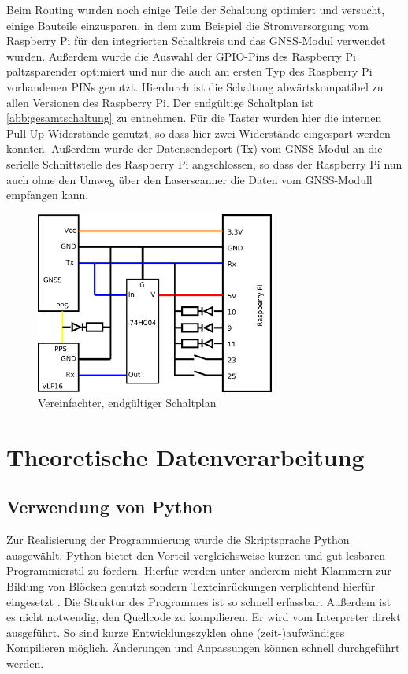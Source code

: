 \documentclass[a4paper,12pt,bibliography=totoc, listof=totoc,titlepage,pointlessnumbers]{scrreprt}
\begin{document}
Beim Routing wurden noch einige Teile der Schaltung optimiert und versucht, einige Bauteile einzusparen, in dem zum Beispiel die Stromversorgung vom Raspberry Pi für den integrierten Schaltkreis und das GNSS-Modul verwendet wurden. Außerdem wurde die Auswahl der GPIO-Pins des Raspberry Pi paltzsparender optimiert und nur die auch am ersten Typ des Raspberry Pi vorhandenen PINs genutzt. Hierdurch ist die Schaltung abwärtskompatibel zu allen Versionen des Raspberry Pi. Der endgültige Schaltplan ist \autoref{abb:gesamtschaltung} zu entnehmen. Für die Taster wurden hier die internen Pull-Up-Widerstände genutzt, so dass hier zwei Widerstände eingespart werden konnten. Außerdem wurde der Datensendeport (Tx) vom GNSS-Modul an die serielle Schnittstelle des Raspberry Pi angschlossen, so dass der Raspberry Pi nun auch ohne den Umweg über den Laserscanner die Daten vom GNSS-Modull empfangen kann.

\begin{figure}
 \centering
 \includegraphics[width=0.7\textwidth]{img/schaltungGesamt.png}
 \caption{Vereinfachter, endgültiger Schaltplan}
 \label{abb:gesamtschaltung}
\end{figure}


\chapter{Theoretische Datenverarbeitung}
\label{c:datenverarbeitung}

\section{Verwendung von Python}
Zur Realisierung der Programmierung wurde die Skriptsprache Python ausgewählt. Python bietet den Vorteil vergleichsweise kurzen und gut lesbaren Programmierstil zu fördern. Hierfür werden unter anderem nicht Klammern zur Bildung von Blöcken genutzt sondern Texteinrückungen verplichtend hierfür eingesetzt \citep[S. 13f]{python}. Die Struktur des Programmes ist so schnell erfassbar. Außerdem ist es nicht notwendig, den Quellcode zu kompilieren. Er wird vom Interpreter direkt ausgeführt. So sind kurze Entwicklungszyklen ohne (zeit-)aufwändiges Kompilieren möglich. Änderungen und Anpassungen können schnell durchgeführt werden.
\end{document}
